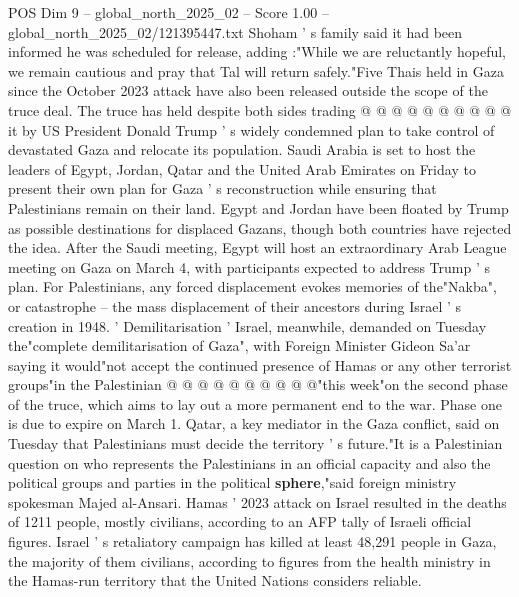 \begin{textsample}{POS Dim 9 – global\_north\_2025\_02 – Score 1.00 – global\_north\_2025\_02/121395447.txt}
Shoham ' s family said it had been informed he was scheduled for release, adding :"While we are reluctantly hopeful, we remain cautious and pray that Tal will return safely."Five Thais held in Gaza since the October 2023 attack have also been released outside the scope of the truce deal.
The truce has held despite both sides trading @ @ @ @ @ @ @ @ @ @ it by US President Donald Trump ' s widely condemned plan to take control of devastated Gaza and relocate its population.
Saudi Arabia is set to host the leaders of Egypt, Jordan, Qatar and the United Arab Emirates on Friday to present their own plan for Gaza ' s reconstruction while ensuring that Palestinians remain on their land.
Egypt and Jordan have been floated by Trump as possible destinations for displaced Gazans, though both countries have rejected the idea.
After the Saudi meeting, Egypt will host an extraordinary Arab League meeting on Gaza on March 4, with participants expected to address Trump ' s plan.
For Palestinians, any forced displacement evokes memories of the"Nakba", or catastrophe -- the mass displacement of their ancestors during Israel ' s creation in 1948. ' Demilitarisation ' Israel, meanwhile, demanded on Tuesday the"complete demilitarisation of Gaza", with Foreign Minister Gideon Sa'ar saying it would"not accept the continued presence of Hamas or any other terrorist groups"in the Palestinian @ @ @ @ @ @ @ @ @ @"this week"on the second phase of the truce, which aims to lay out a more permanent end to the war.
Phase one is due to expire on March 1.
Qatar, a key mediator in the Gaza conflict, said on Tuesday that Palestinians must decide the territory ' s future."It is a Palestinian question on who represents the Palestinians in an official capacity and also the political groups and parties in the political \textbf{sphere},"said foreign ministry spokesman Majed al-Ansari.
Hamas ' 2023 attack on Israel resulted in the deaths of 1211 people, mostly civilians, according to an AFP tally of Israeli official figures.
Israel ' s retaliatory campaign has killed at least 48,291 people in Gaza, the majority of them civilians, according to figures from the health ministry in the Hamas-run territory that the United Nations considers reliable.

\end{textsample}
